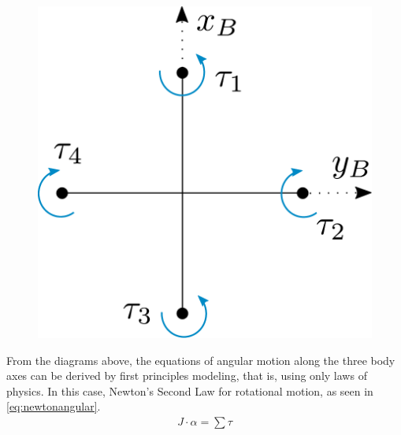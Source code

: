 \begin{minipage}{\linewidth}
\begin{minipage}{0.6\linewidth}
\begin{figure}[H]
			\label{fig:droneDiagram}
		\end{figure}
	\end{minipage}
	\hspace{0.03\linewidth}
	\begin{minipage}{0.35\linewidth}
		\begin{figure}[H] \vspace{20mm}
			\includegraphics[scale=.4]{figures/torquesDiagram}
			\centering
            \vspace{10mm}
			\label{fig:torquesDiagram}
		\end{figure}
	\end{minipage}
\end{minipage}

From the diagrams above, the equations of angular motion along the three body axes can be derived by first principles modeling, that is, using only laws of physics. In this case, Newton's Second Law for rotational motion, as seen in \autoref{eq:newtonangular}.
%
\begin{align}
	J\cdot\alpha=\sum\tau
	\label{eq:newtonangular}
\end{align}
\begin{where}
\end{where}

